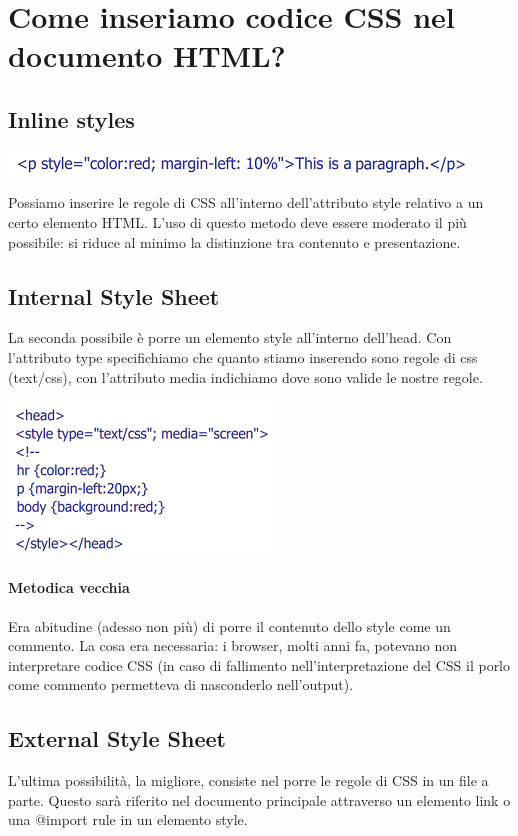 \documentclass[11pt]{report}
\begin{document}
\section*{Come inseriamo codice CSS nel documento HTML?}
\subsection*{Inline styles}
\begin{center}
\includegraphics{img/2.PNG}
\end{center}
Possiamo inserire le regole di CSS all'interno dell'attributo style relativo a un certo elemento HTML. L'uso di questo metodo deve essere moderato il più possibile: si riduce al minimo la distinzione tra contenuto e presentazione.
\subsection*{Internal Style Sheet}
La seconda possibile è porre un elemento style all'interno dell'head. Con l'attributo type specifichiamo che quanto stiamo inserendo sono regole di css (text/css), con l'attributo media indichiamo dove sono valide le nostre regole. 
\begin{center}
\includegraphics{img/3.PNG}
\end{center}
\paragraph{Metodica vecchia} Era abitudine (adesso non più) di porre il contenuto dello style come un commento. La cosa era necessaria: i browser, molti anni fa, potevano non interpretare codice CSS (in caso di fallimento nell'interpretazione del CSS il porlo come commento permetteva di nasconderlo nell'output).

\subsection*{External Style Sheet}
L'ultima possibilità, la migliore, consiste nel porre le regole di CSS in un file a parte. Questo sarà riferito nel documento principale attraverso un elemento link o una @import rule in un elemento style.
\end{document}

